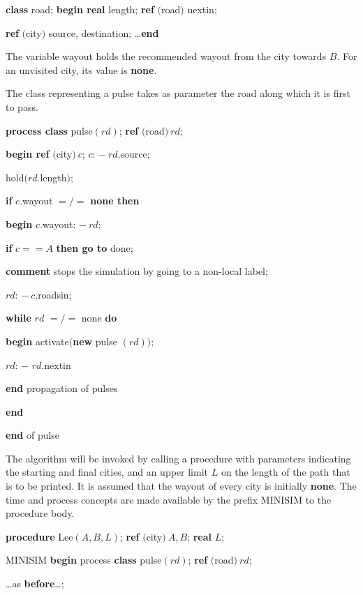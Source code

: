 \quad \textbf{class} road; \textbf{begin real} length; \textbf{ref} $($road$)$ nextin;

\quad \quad \textbf{ref} $($city$)$ source, destination; \dots \textbf{end}

\noindent
The variable wayout holds the recommended wayout from the city towards $B$. For an unvisited city, its value is \textbf{none}.

The class representing a pulse takes as parameter the road along which it is first to pass.

\quad \textbf{process class} pulse$(rd)$; \textbf{ref} $($road$)\ rd$;

\quad \textbf{begin ref} $($city$)\ c$; $c$: $-\ rd$.source;

\quad \quad hold$(rd$.length$)$;

\quad \quad \textbf{if} $c$.wayout $=/=$ \textbf{none then}

\quad \quad \textbf{begin} $c$.wayout: $-\ rd$;

\quad \quad \quad \textbf{if} $c == A$ \textbf{then go to} done;

\quad \quad \quad \textbf{comment} stops the simulation by going to a non-local label;

\quad \quad \quad $rd$: $-\ c$.roadsin;

\quad \quad \quad \textbf{while} $rd$ $=/=$ none \textbf{do}

\quad \quad \quad \textbf{begin} activate$($\textbf{new} pulse $(rd));$

\quad \quad \quad \quad $rd$: $-$ $rd$.nextin

\quad \quad \quad \textbf{end} propagation of pulses

\quad \quad \textbf{end}

\quad \textbf{end} of pulse

The algorithm will be invoked by calling a procedure with parameters indicating the starting and final cities, and an upper limit $L$ on the length of the path that is to be printed. It is assumed that the wayout of every city is initially \textbf{none}. The time and process concepts are made available by the prefix MINISIM to the procedure body.

\quad \textbf{procedure} Lee$(A, B, L)$; \textbf{ref} $($city$)\ A, B$; \textbf{real} $L$;

\quad \quad MINISIM \textbf{begin} process \textbf{class} pulse$(rd)$; \textbf{ref} $($road$)\ rd$;

\quad \quad \quad \dots as \textbf{before}\dots;

